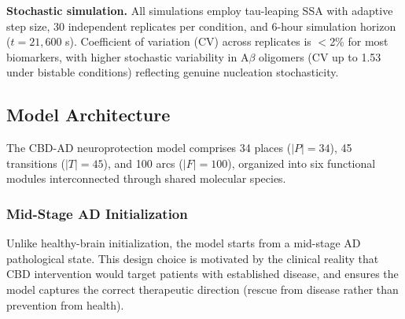 \documentclass[10pt,letterpaper]{article}
\begin{document}
\vspace{3pt}
\noindent\textbf{Stochastic simulation.} All simulations employ tau-leaping SSA with adaptive step size, 30 independent replicates per condition, and 6-hour simulation horizon ($t = 21{,}600$ s). Coefficient of variation (CV) across replicates is $<$2\% for most biomarkers, with higher stochastic variability in A$\beta$ oligomers (CV up to 1.53 under bistable conditions) reflecting genuine nucleation stochasticity.

\subsection{Model Architecture}

The CBD-AD neuroprotection model comprises 34 places ($|P| = 34$), 45 transitions ($|T| = 45$), and 100 arcs ($|F| = 100$), organized into six functional modules interconnected through shared molecular species.

\subsubsection{Mid-Stage AD Initialization}

Unlike healthy-brain initialization, the model starts from a mid-stage AD pathological state. This design choice is motivated by the clinical reality that CBD intervention would target patients with established disease, and ensures the model captures the correct therapeutic direction (rescue from disease rather than prevention from health).
\end{document}
